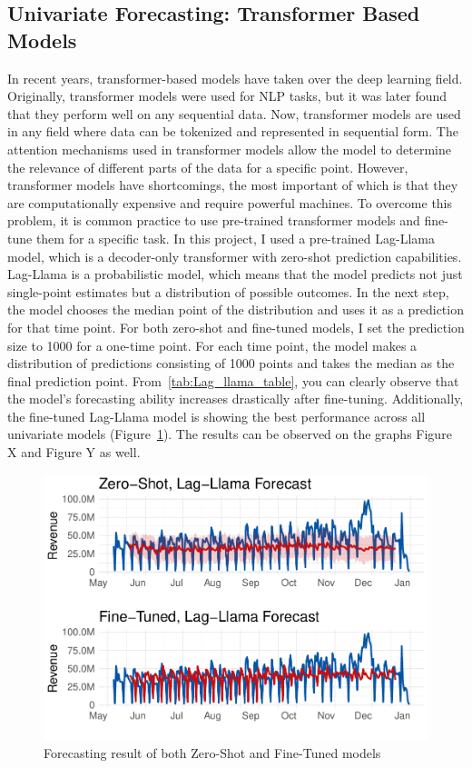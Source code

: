 \documentclass[conference]{IEEEtran}
\begin{document}
\subsection{Univariate Forecasting: Transformer Based Models}
In recent years, transformer-based models have taken over the deep learning field. Originally, transformer models were used for NLP tasks, but it was later found that they perform well on any sequential data. Now, transformer models are used in any field where data can be tokenized and represented in sequential form. The attention mechanisms used in transformer models allow the model to determine the relevance of different parts of the data for a specific point. However, transformer models have shortcomings, the most important of which is that they are computationally expensive and require powerful machines. To overcome this problem, it is common practice to use pre-trained transformer models and fine-tune them for a specific task. In this project, I used a pre-trained Lag-Llama model, which is a decoder-only transformer with zero-shot prediction capabilities. Lag-Llama is a probabilistic model, which means that the model predicts not just single-point estimates but a distribution of possible outcomes. In the next step, the model chooses the median point of the distribution and uses it as a prediction for that time point. For both zero-shot and fine-tuned models, I set the prediction size to 1000 for a one-time point. For each time point, the model makes a distribution of predictions consisting of 1000 points and takes the median as the final prediction point. From~\autoref{tab:Lag_llama_table}, you can clearly observe that the model's forecasting ability increases drastically after fine-tuning. Additionally, the fine-tuned Lag-Llama model is showing the best performance across all univariate models (Figure~\ref{fig:lag_llama_predictions}). The results can be observed on the graphs Figure X and Figure Y as well.


\begin{figure}[htbp]
\centering
\includegraphics[width=\columnwidth,keepaspectratio]{./figures/lag_llam_prediction.pdf}
\caption{Forecasting result of both Zero-Shot and Fine-Tuned models \cite{lagllamaforecast}}
\label{fig:lag_llama_predictions}
\end{figure}
\end{document}
